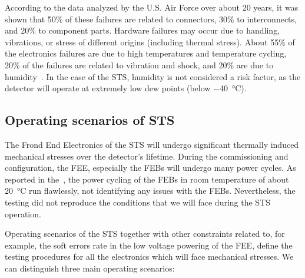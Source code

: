 According to the data analyzed by the U.S. Air Force over about 20 years, it was shown that 50\% of these failures are related to connectors, 30\% to interconnects, and 20\% to component
parts. Hardware failures may occur due to handling, vibrations, or stress of different origins (including thermal stress). About 55\% of the electronics failures are due to high temperatures and temperature cycling, 20\% of the failures are related to vibration and shock, and 20\% are due to humidity~\cite{thermal_electronics}. In the case of the \gls{STS}, humidity is not considered a risk factor, as the detector will operate at extremely low dew points (below \SI{-40}{\celsius}). 

\subsection{Operating scenarios of STS}
\label{nominal}
The Frond End Electronics of the \gls{STS} will undergo significant thermally induced mechanical stresses over the detector's lifetime. During the commissioning and configuration, the \gls{FEE}, especially the \glspl{FEB} will undergo many power cycles. As reported in the~\cite{CBM_PR_2021}, the power cycling of the \glspl{FEB} in room temperature of about \SI{20}{\celsius} run flawlessly, not identifying any issues with the \glspl{FEB}. Nevertheless, the testing did not reproduce the conditions that we will face during the \gls{STS} operation.

Operating scenarios of the \gls{STS} together with other constraints related to, for example, the soft errors rate in the low voltage powering of the \gls{FEE}, define the testing procedures for all the electronics which will face mechanical stresses. We can distinguish three main operating scenarios:

